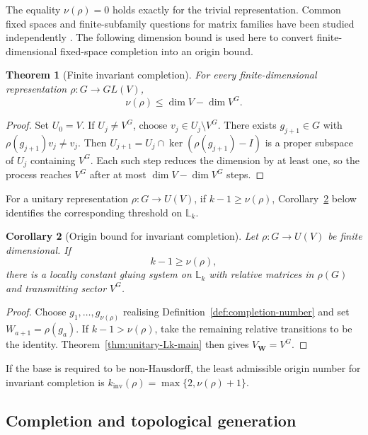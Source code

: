 \documentclass[11pt]{article}
\theoremstyle{plain}
\newtheorem{theorem}{Theorem}[section]
\newtheorem{corollary}[theorem]{Corollary}
\theoremstyle{definition}
\begin{document}
The equality \(\nu(\rho)=0\) holds exactly for the trivial representation. Common fixed spaces and finite-subfamily questions for matrix families have been studied independently
\citep{BernikEtAl2005CommonFixed}. The following dimension bound is used here to convert finite-dimensional fixed-space completion into an origin bound.

\begin{theorem}[Finite invariant completion]
\label{thm:finite-invariant-completion}
For every finite-dimensional representation \(\rho:G\to GL(V)\),
\[
\nu(\rho)
\leq
\dim V-\dim V^G.
\]
\end{theorem}

\begin{proof}
Set \(U_0=V\). If \(U_j\neq V^G\), choose \(v_j\in U_j\setminus V^G\). There exists \(g_{j+1}\in G\) with
\(\rho(g_{j+1})v_j\neq v_j\).
Then \(U_{j+1} = U_j\cap\ker(\rho(g_{j+1})-I)\) is a proper subspace of \(U_j\) containing \(V^G\). Each such step reduces the dimension by at least one, so the process reaches \(V^G\) after at most \(\dim V-\dim V^G\) steps.
\end{proof}

For a unitary representation \(\rho:G\to U(V)\), if
\(k-1\geq\nu(\rho)\),
Corollary~\ref{cor:origin-completion} below identifies the corresponding threshold on \(\mathbb L_k\).

\begin{corollary}[Origin bound for invariant completion]
\label{cor:origin-completion}
Let \(\rho:G\to U(V)\) be finite dimensional. If
\[
k-1\geq\nu(\rho),
\]
there is a locally constant gluing system on \(\mathbb L_k\) with relative matrices in \(\rho(G)\) and transmitting sector \(V^G\).
\end{corollary}

\begin{proof}
Choose \(g_1,\ldots,g_{\nu(\rho)}\) realising Definition~\ref{def:completion-number} and set
\(W_{a+1}=\rho(g_a)\).
If \(k-1>\nu(\rho)\), take the remaining relative transitions to be the identity. Theorem~\ref{thm:unitary-Lk-main} then gives
\(V_{\mathbf W}=V^G\).
\end{proof}

If the base is required to be non-Hausdorff, the least admissible origin number for invariant completion is
\(k_{\mathrm{inv}}(\rho) = \max\{2,\nu(\rho)+1\}\).

\subsection{Completion and topological generation}
\end{document}

